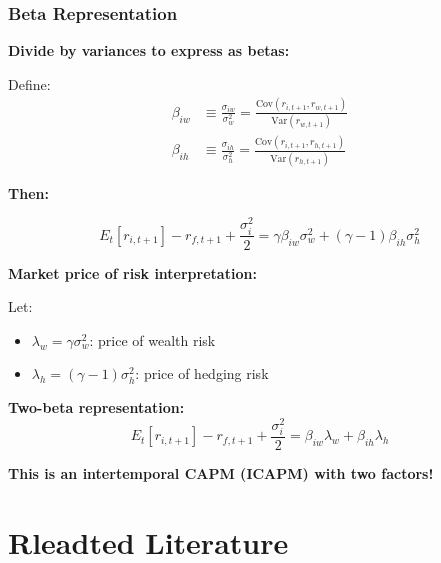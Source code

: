 \documentclass{beamer}
\begin{document}
\begin{frame}[allowframebreaks]
    \frametitle{Beta Representation}
    
    \textbf{Divide by variances to express as betas:}
    
    Define:
    \begin{align*}
        \beta_{iw} &\equiv \frac{\sigma_{iw}}{\sigma_w^2} = \frac{\text{Cov}(r_{i,t+1}, r_{w,t+1})}{\text{Var}(r_{w,t+1})}\\
        \beta_{ih} &\equiv \frac{\sigma_{ih}}{\sigma_h^2} = \frac{\text{Cov}(r_{i,t+1}, r_{h,t+1})}{\text{Var}(r_{h,t+1})}
    \end{align*}
    
    \textbf{Then:}
    \begin{tcolorbox}[colback=green!5!white, colframe=green!75!black]
    \begin{equation*}
        E_t[r_{i,t+1}] - r_{f,t+1} + \frac{\sigma_i^2}{2} = \gamma \beta_{iw} \sigma_w^2 + (\gamma-1)\beta_{ih}\sigma_h^2
    \end{equation*}
    \end{tcolorbox}
    
    \framebreak
    
    \textbf{Market price of risk interpretation:}
    
    Let:
    \begin{itemize}
        \item $\lambda_w = \gamma \sigma_w^2$: price of wealth risk
        \item $\lambda_h = (\gamma-1)\sigma_h^2$: price of hedging risk
    \end{itemize}
    
    \textbf{Two-beta representation:}
    \begin{equation*}
        E_t[r_{i,t+1}] - r_{f,t+1} + \frac{\sigma_i^2}{2} = \beta_{iw}\lambda_w + \beta_{ih}\lambda_h
    \end{equation*}
    
    \textbf{This is an intertemporal CAPM (ICAPM) with two factors!}
\end{frame}

\section{Rleadted Literature}
\end{document}
